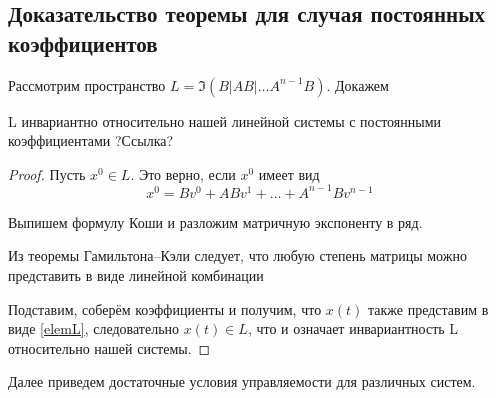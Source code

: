 \subsection{Доказательство теоремы для случая постоянных коэффициентов}
Рассмотрим пространство $L = \Im (B|AB| \ldots A^{n-1}B)$. Докажем

\begin{lemma}
	L инвариантно относительно нашей линейной системы с постоянными коэффициентами ?Ссылка?
\end{lemma}
\begin{proof}
	Пусть $x^0 \in L$. Это верно, если $x^0$ имеет вид
	\begin{equation}
		x^0 = B v^0 + AB v^1 + \ldots + A^{n-1} B v^{n-1} \label{elemL}
	\end{equation}

	Выпишем формулу Коши и разложим матричную экспоненту в ряд.
	
	Из теоремы Гамильтона--Кэли следует, что любую степень матрицы можно представить в виде линейной комбинации
	
	Подставим, соберём коэффициенты и получим, что $x(t)$ также представим в виде \eqref{elemL}, следовательно $x(t) \in L$, что и означает инвариантность L относительно нашей системы.
\end{proof}

Далее приведем достаточные условия управляемости для различных систем.